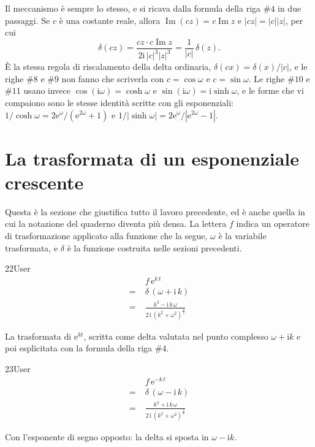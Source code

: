 Il meccanismo è sempre lo stesso, e si ricava dalla formula della riga $\#4$ in due passaggi. Se $c$ è una costante reale, allora $\operatorname{Im}(cz)=c\operatorname{Im}z$ e $|cz|=|c||z|$, per cui
\[
  \delta(cz)=\frac{cz\cdot c\operatorname{Im}z}{2\mathrm{i}\,|c|^3|z|^3}=\frac{1}{|c|}\,\delta(z).
\]
È la stessa regola di riscalamento della delta ordinaria, $\delta(cx)=\delta(x)/|c|$, e le righe $\#8$ e $\#9$ non fanno che scriverla con $c=\cos\omega$ e $c=\sin\omega$. Le righe $\#10$ e $\#11$ usano invece $\cos(\mathrm{i}\omega)=\cosh\omega$ e $\sin(\mathrm{i}\omega)=\mathrm{i}\sinh\omega$, e le forme che vi compaiono sono le stesse identità scritte con gli esponenziali: $1/\cosh\omega=2\mathrm{e}^{\omega}/\left(\mathrm{e}^{2\omega}+1\right)$ e $1/|\sinh\omega|=2\mathrm{e}^{\omega}/\left|\mathrm{e}^{2\omega}-1\right|$.

\section{La trasformata di un esponenziale crescente}

Questa è la sezione che giustifica tutto il lavoro precedente, ed è anche quella in cui la notazione del quaderno diventa più densa. La lettera $f$ indica un operatore di trasformazione applicato alla funzione che la segue, $\omega$ è la variabile trasformata, e $\delta$ è la funzione costruita nelle sezioni precedenti.

\begin{espr}{22}{User}{}
\begin{align*}
& f\, \mathrm{e}^{k\, t} \\
=\;& \delta\, \left(\omega + \mathrm{i}\, k\right) \\
=\;& \frac{k^{2} - \mathrm{i}\, k\, \omega}{2\, \mathrm{i}\, \left(k^{2} + \omega^{2}\right)^{\frac{3}{2}}}
\end{align*}
\end{espr}
La trasformata di $\mathrm{e}^{kt}$, scritta come delta valutata nel punto complesso $\omega+\mathrm{i}k$ e poi esplicitata con la formula della riga $\#4$.

\begin{espr}{23}{User}{}
\begin{align*}
& f\, \mathrm{e}^{-k\, t} \\
=\;& \delta\, \left(\omega - \mathrm{i}\, k\right) \\
=\;& \frac{k^{2} + \mathrm{i}\, k\, \omega}{2\, \mathrm{i}\, \left(k^{2} + \omega^{2}\right)^{\frac{3}{2}}}
\end{align*}
\end{espr}
Con l'esponente di segno opposto: la delta si sposta in $\omega-\mathrm{i}k$.

